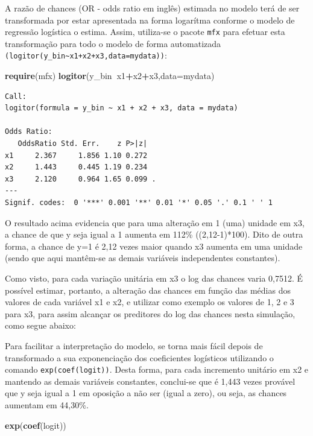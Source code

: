 \documentclass[12pt,brazil,oneside]{book}
\newenvironment{Shaded}{\begin{snugshade}}{\end{snugshade}}
\newcommand{\DataTypeTok}[1]{\textcolor[rgb]{0.13,0.29,0.53}{#1}}
\newcommand{\KeywordTok}[1]{\textcolor[rgb]{0.13,0.29,0.53}{\textbf{#1}}}
\newcommand{\NormalTok}[1]{#1}
\newcommand{\OperatorTok}[1]{\textcolor[rgb]{0.81,0.36,0.00}{\textbf{#1}}}
\begin{document}
A razão de chances (OR - odds ratio em inglês) estimada no modelo terá
de ser transformada por estar apresentada na forma logarítma conforme o
modelo de regressão logística o estima. Assim, utiliza-se o pacote
\texttt{mfx} para efetuar esta transformação para todo o modelo de forma
automatizada
\texttt{(logitor(y\_bin\textasciitilde{}x1+x2+x3,data=mydata))}:

\begin{Shaded}
\begin{Highlighting}[]
\KeywordTok{require}\NormalTok{(mfx)}
\KeywordTok{logitor}\NormalTok{(y_bin}\OperatorTok{~}\NormalTok{x1}\OperatorTok{+}\NormalTok{x2}\OperatorTok{+}\NormalTok{x3,}\DataTypeTok{data=}\NormalTok{mydata)}
\end{Highlighting}
\end{Shaded}

\begin{verbatim}
Call:
logitor(formula = y_bin ~ x1 + x2 + x3, data = mydata)

Odds Ratio:
   OddsRatio Std. Err.    z P>|z|  
x1     2.367     1.856 1.10 0.272  
x2     1.443     0.445 1.19 0.234  
x3     2.120     0.964 1.65 0.099 .
---
Signif. codes:  0 '***' 0.001 '**' 0.01 '*' 0.05 '.' 0.1 ' ' 1
\end{verbatim}

O resultado acima evidencia que para uma alteração em 1 (uma) unidade em
x3, a chance de que y seja igual a 1 aumenta em 112\% ((2,12-1)*100).
Dito de outra forma, a chance de y=1 é 2,12 vezes maior quando x3
aumenta em uma unidade (sendo que aqui mantêm-se as demais variáveis
independentes constantes).

Como visto, para cada variação unitária em x3 o log das chances varia
0,7512. É possível estimar, portanto, a alteração das chances em função
das médias dos valores de cada variável x1 e x2, e utilizar como exemplo
os valores de 1, 2 e 3 para x3, para assim alcançar os preditores do log
das chances nesta simulação, como segue abaixo:

Para facilitar a interpretação do modelo, se torna mais fácil depois de
transformado a sua exponenciação dos coeficientes logísticos utilizando
o comando \texttt{exp(coef(logit))}. Desta forma, para cada incremento
unitário em x2 e mantendo as demais variáveis constantes, conclui-se que
é 1,443 vezes provável que y seja igual a 1 em oposição a não ser (igual
a zero), ou seja, as chances aumentam em 44,30\%.

\begin{Shaded}
\begin{Highlighting}[]
\KeywordTok{exp}\NormalTok{(}\KeywordTok{coef}\NormalTok{(logit))}
\end{Highlighting}
\end{Shaded}
\end{document}
